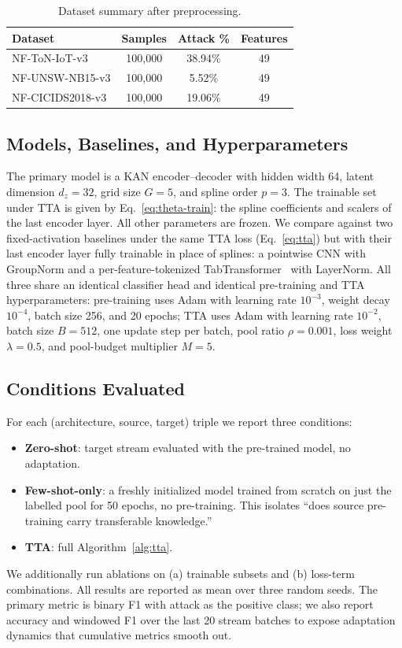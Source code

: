 \documentclass[10pt, conference, letterpaper]{IEEEtran}
\begin{document}
\begin{table}[h]
\centering
\caption{Dataset summary after preprocessing.}
\label{tab:datasets}
\begin{tabular}{lccc}
\toprule
\textbf{Dataset} & \textbf{Samples} & \textbf{Attack \%} & \textbf{Features} \\
\midrule
NF-ToN-IoT-v3    & 100,000 & 38.94\% & 49 \\
NF-UNSW-NB15-v3  & 100,000 & 5.52\%  & 49 \\
NF-CICIDS2018-v3 & 100,000 & 19.06\% & 49 \\
\bottomrule
\end{tabular}
\end{table}

\subsection{Models, Baselines, and Hyperparameters}

The primary model is a KAN encoder--decoder with hidden width 64, latent dimension $d_z = 32$, grid size $G = 5$, and spline order $p = 3$. The trainable set under TTA is given by Eq.~\eqref{eq:theta-train}: the spline coefficients and scalers of the last encoder layer. All other parameters are frozen. We compare against two fixed-activation baselines under the same TTA loss (Eq.~\eqref{eq:tta}) but with their last encoder layer fully trainable in place of splines: a pointwise CNN with GroupNorm and a per-feature-tokenized TabTransformer~\cite{huang2020tabtransformer, vaswani2017attention} with LayerNorm. All three share an identical classifier head and identical pre-training and TTA hyperparameters: pre-training uses Adam with learning rate $10^{-3}$, weight decay $10^{-4}$, batch size 256, and 20 epochs; TTA uses Adam with learning rate $10^{-2}$, batch size $B = 512$, one update step per batch, pool ratio $\rho = 0.001$, loss weight $\lambda = 0.5$, and pool-budget multiplier $M = 5$.

\subsection{Conditions Evaluated}

For each (architecture, source, target) triple we report three conditions:
\begin{itemize}
    \item \textbf{Zero-shot}: target stream evaluated with the pre-trained model, no adaptation.
    \item \textbf{Few-shot-only}: a freshly initialized model trained from scratch on just the labelled pool for 50 epochs, no pre-training. This isolates ``does source pre-training carry transferable knowledge.''
    \item \textbf{TTA}: full Algorithm~\ref{alg:tta}.
\end{itemize}
We additionally run ablations on (a) trainable subsets and (b) loss-term combinations. All results are reported as mean over three random seeds. The primary metric is binary F1 with attack as the positive class; we also report accuracy and windowed F1 over the last 20 stream batches to expose adaptation dynamics that cumulative metrics smooth out.
\end{document}
